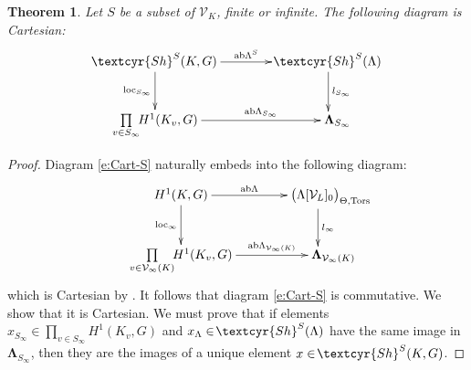 \documentclass[11pt]{amsart}
\newcommand{\Sha}{{\!\textcyr{Sh}}}
\theoremstyle{plain}
\newtheorem{theorem}{Theorem}[section]
\theoremstyle{definition}
\newcommand{\ab}{{\rm ab}}
\newcommand{\hs}{\kern 0.8pt}
\newcommand{\V}{{\mathcal V}}
\newcommand{\Tors}{{\rm Tors}}
\newcommand{\LambdaB}{{\boldsymbol{\Lambda}}}
\newcommand{\Tht}{{\Theta,\Tors}}
\newcommand{\loc}{{\rm loc}}
\newcommand{\abLambda}{{{\rm ab}\Lambda}}
\begin{document}
\begin{theorem}\label{t:Sha}
Let $S$ be a subset of $\V_K$\hs, finite or infinite.
The following diagram is  Cartesian:
\begin{equation}\label{e:Cart-S}
\begin{aligned}
\xymatrix@C=14mm{
\Sha^S(K,G)\ar[r]^-{\abLambda^S} \ar[d]_-{\loc_{S_\infty}}     &\Sha^S(\Lambda)\ar[d]^-{l_{S_\infty}} \\
\prod\limits_{v\in S_\infty}\!\! H^1(K_v,G)\ar[r]^-{\ab\Lambda_{S_\infty}}  &\LambdaB_{S_\infty}\hskip-5mm
}
\end{aligned}
\end{equation}
\end{theorem}

\begin{proof}
Diagram \eqref{e:Cart-S} naturally embeds into the following diagram:
\begin{equation}\label{e:Cart}
\begin{aligned}
\xymatrix@C=14mm{
H^1(K,G)\ar[r]^-{\abLambda} \ar[d]_-{\loc_\infty}  &\big(\Lambda[\V_L]_0\big)_\Tht\hskip-7mm\ar[d]^-{l_\infty} \\
\prod\limits_{v\in \V_\infty(K)}\!\! H^1(K_v,G)\ar[r]^-{\ab\Lambda_{\V_\infty(K)}}
       &\LambdaB_{\V_\infty(K)}\hskip-8.5mm
}
\end{aligned}
\end{equation}
which is Cartesian by \cite[Theorem 5.5.10]{BK}.
It follows that diagram \eqref{e:Cart-S} is commutative.
We show that it is Cartesian.
We must prove that if elements $x_{S_\infty}\in \prod_{v\in S_\infty} H^1(K_v,G)$ and
$x_\Lambda\in \Sha^S(\Lambda)$ have the same image in
$\LambdaB_{S_\infty}$,
then they are the images of a unique element
$x\in\Sha^S(K,G)$.


\end{proof}
\end{document}
